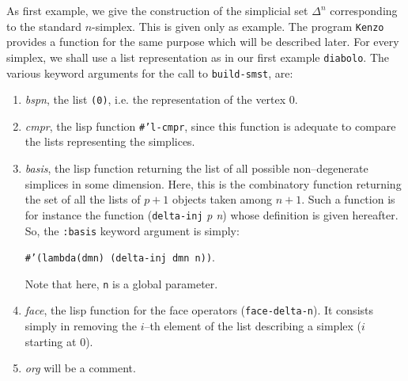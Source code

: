 As first example, we give the construction of the simplicial set $\Delta^n$  cor\-res\-pon\-ding to the
standard $n$-simplex. This is given only as example. The program {\tt Kenzo} provides a function
for the same purpose which will be described later.
For every simplex, we shall use a list representation as in our first example {\tt diabolo}. The various
keyword arguments for the call to {\tt build-smst}, are:
\newpage
\begin{enumerate}
\item {\em bspn}, the list {\tt (0)}, i.e. the representation of the vertex $0$.
\item {\em cmpr}, the lisp function  {\tt \#'l-cmpr}, since this function is adequate to compare the
lists representing the simplices.
\item {\em basis}, the lisp function returning the list of all possible
non--degenerate simplices in some dimension. Here, this is the combinatory function returning the set
of all the lists of $p+1$ objects taken among $n+1$.
Such a function is for instance the function  ({\tt delta-inj} {\em p n}) whose definition is given
hereafter. So, the  {\tt :basis} keyword argument is simply:
\par {\footnotesize\tt \#'(lambda(dmn) (delta-inj dmn n))}.
\par
Note that here, {\tt n} is a global parameter.
\item  {\em face}, the lisp function for the face operators ({\tt face-delta-n}). It consists simply in
removing the $i$--th element of the list describing a simplex ($i$ starting at $0$).
\item  {\em org} will be a comment.
\end{enumerate}

